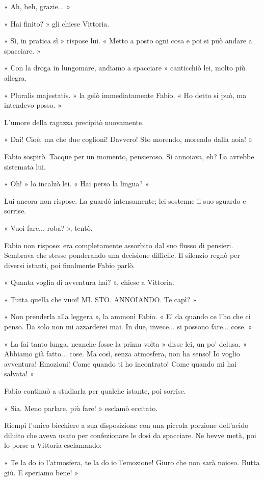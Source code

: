 « Ah, beh, grazie... »

« Hai finito? » gli chiese Vittoria.

« Sì, in pratica sì » rispose lui. « Metto a posto ogni cosa e poi si può andare a spacciare. »

« Con la droga in lungomare, andiamo a spacciare » canticchiò lei, molto più allegra.

« Pluralis majestatis. » la gelò immediatamente Fabio. « Ho detto si può, ma intendevo posso. »

L'umore della ragazza precipitò nuovamente.

« Dai! Cioè, ma che due coglioni! Davvero! Sto morendo, morendo dalla noia! »

Fabio sospirò. Tacque per un momento, pensieroso. Si annoiava, eh? La avrebbe sistemata lui.

« Oh! » lo incalzò lei. « Hai perso la lingua? »

Lui ancora non rispose. La guardò intensamente; lei sostenne il suo sguardo e sorrise.

« Vuoi fare... roba? », tentò.

Fabio non rispose: era completamente assorbito dal suo flusso di pensieri. Sembrava che stesse ponderando una decisione difficile. Il silenzio regnò per diversi istanti, poi finalmente Fabio parlò.

« Quanta voglia di avventura hai? », chiese a Vittoria.

« Tutta quella che vuoi! MI. STO. ANNOIANDO. Te capì? »

« Non prenderla alla leggera », la ammonì Fabio. « E' da quando ce l'ho che ci penso. Da solo non mi azzarderei mai. In due, invece... si possono fare... cose. »

« La fai tanto lunga, neanche fosse la prima volta » disse lei, un po' delusa. « Abbiamo già fatto... cose. Ma così, senza atmosfera, non ha senso! Io voglio avventura! Emozioni! Come quando ti ho incontrato! Come quando mi hai salvata! »

Fabio continuò a studiarla per qualche istante, poi sorrise.

« Sia. Meno parlare, più fare! » esclamò eccitato.

Riempì l'unico bicchiere a sua disposizione con una piccola porzione dell'acido diluito che aveva usato per confezionare le dosi da spacciare. Ne bevve metà, poi lo porse a Vittoria esclamando:

« Te la do io l'atmosfera, te la do io l'emozione! Giuro che non sarà noioso. Butta giù. E speriamo bene! »


